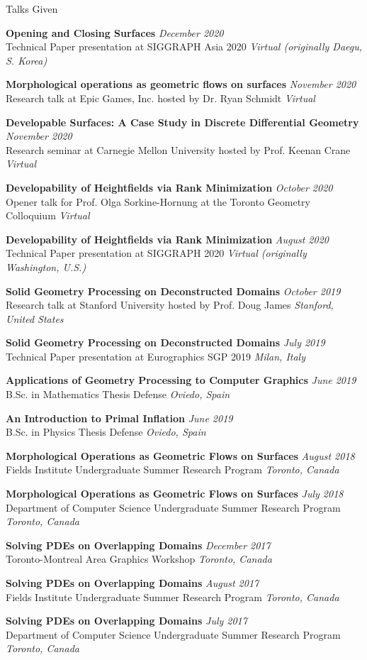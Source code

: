 \documentclass{resume}
\newcommand{\talk}[4]{
    {\bf #1} \hfill {\em \small #2} \\ %
    {\small #3} \hfill {\em \small #4}
}
\begin{document}
\begin{rSection}{Talks Given}
\talk{Opening and Closing Surfaces}{December 2020}
{Technical Paper presentation at SIGGRAPH Asia 2020}{Virtual (originally Daegu, S. Korea)}

\talk{Morphological operations as geometric flows on surfaces}{November 2020}
{Research talk at Epic Games, Inc. hosted by Dr. Ryan Schmidt}{Virtual}

\talk{Developable Surfaces: A Case Study in Discrete Differential Geometry}{November 2020}
{Research seminar at Carnegie Mellon University hosted by Prof. Keenan Crane}{Virtual}

\talk{Developability of Heightfields via Rank Minimization}{October 2020}
{Opener talk for Prof. Olga Sorkine-Hornung at the Toronto Geometry Colloquium}{Virtual}

\talk{Developability of Heightfields via Rank Minimization}{August 2020}
{Technical Paper presentation at SIGGRAPH 2020}{Virtual (originally Washington, U.S.)}

\talk{Solid Geometry Processing on Deconstructed Domains}{October 2019}
{Research talk at Stanford University hosted by Prof. Doug James}{Stanford, United States}

\talk{Solid Geometry Processing on Deconstructed Domains}{July 2019}
{Technical Paper presentation at Eurographics SGP 2019}{Milan, Italy}

\talk{Applications of Geometry Processing to Computer Graphics}{June 2019}
{B.Sc. in Mathematics Thesis Defense}{Oviedo, Spain}

\talk{An Introduction to Primal Inflation}{June 2019}
{B.Sc. in Physics Thesis Defense}{Oviedo, Spain}

\talk{Morphological Operations as Geometric Flows on Surfaces}{August 2018}
{Fields Institute Undergraduate Summer Research Program}{Toronto, Canada}

\talk{Morphological Operations as Geometric Flows on Surfaces}{July 2018}
{Department of Computer Science Undergraduate Summer Research Program}{Toronto, Canada}

\talk{Solving PDEs on Overlapping Domains}{December 2017}
{Toronto-Montreal Area Graphics Workshop}{Toronto, Canada}

\talk{Solving PDEs on Overlapping Domains}{August 2017}
{Fields Institute Undergraduate Summer Research Program}{Toronto, Canada}

\talk{Solving PDEs on Overlapping Domains}{July 2017}
{Department of Computer Science Undergraduate Summer Research Program}{Toronto, Canada}

\end{rSection}
\end{document}
